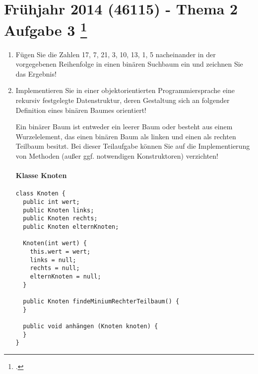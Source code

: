 \documentclass{lehramt-informatik-aufgabe}
\begin{document}

\section{Frühjahr 2014 (46115) - Thema 2 Aufgabe 3
\footcite{examen:46115:2014:03}}

\begin{enumerate}


\item Fügen Sie die Zahlen 17, 7, 21, 3, 10, 13, 1, 5 nacheinander in
der vorgegebenen Reihenfolge in einen binären Suchbaum ein und zeichnen
Sie das Ergebnis!

\begin{center}
\end{center}


\item Implementieren Sie in einer objektorientierten Programmiersprache
eine rekursiv festgelegte Datenstruktur, deren Gestaltung sich an
folgender Definition eines binären Baumes orientiert!

Ein binärer Baum ist entweder ein leerer Baum oder besteht aus einem
Wurzelelement, das einen binären Baum als linken und einen als rechten
Teilbaum besitzt. Bei dieser Teilaufgabe können Sie auf die
Implementierung von Methoden (außer ggf. notwendigen Konstruktoren)
verzichten!

\paragraph{Klasse Knoten}

\begin{verbatim}
class Knoten {
  public int wert;
  public Knoten links;
  public Knoten rechts;
  public Knoten elternKnoten;

  Knoten(int wert) {
    this.wert = wert;
    links = null;
    rechts = null;
    elternKnoten = null;
  }

  public Knoten findeMiniumRechterTeilbaum() {
  }

  public void anhängen (Knoten knoten) {
  }
}
\end{verbatim}


\end{enumerate}
\end{document}
